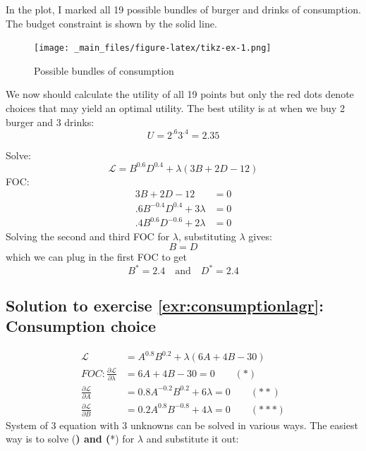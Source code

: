 \documentclass[
  12pt,
  oneside]{book}
\theoremstyle{definition}
\theoremstyle{definition}
\theoremstyle{definition}
\theoremstyle{definition}
\theoremstyle{remark}
\begin{document}
In the plot, I marked all 19 possible bundles of burger and drinks of consumption. The budget constraint is shown by the solid line.

\begin{figure}
\centering
\texttt{[image: \_main\_files/figure-latex/tikz-ex-1.png]}
\caption{\label{fig:tikz-ex}Possible bundles of consumption}
\end{figure}

We now should calculate the utility of all 19 points but only the red dots denote choices that may yield an optimal utility. The best utility is at when we buy 2 burger and 3 drinks: \[U=2^{.6}3^{.4}=2.35\]

Solve:
\[
        \mathcal{L}=B^{0.6}D^{0.4}+\lambda(3B+2D-12)
        \]
FOC:
\begin{align*}
            3B+2D-12&=0\\
            .6B^{-0.4}D^{0.4}+3\lambda&=0\\
            .4B^{0.6}D^{-0.6}+2\lambda&=0
        \end{align*}
Solving the second and third FOC for \(\lambda\), substituting \(\lambda\) gives:
\[B=D\]
which we can plug in the first FOC to get
\[B^*=2.4 \quad \text{and} \quad D^*=2.4\]

\hypertarget{sol:consumptionlagr}{%
\subsection*{Solution to exercise \ref{exr:consumptionlagr}: Consumption choice}\label{sol:consumptionlagr}}

\begin{align*}
        \mathcal{L}&=A^{0.8}B^{0.2}+\lambda(6A+4B-30)\\
        FOC: \frac{\partial \mathcal{L}}{\partial \lambda}&=6A+4B-30=0 \qquad (*)\\
        \frac{\partial \mathcal{L}}{\partial A}&=0.8A^{-0.2}B^{0.2}+6\lambda=0 \qquad (**)\\
        \frac{\partial \mathcal{L}}{\partial B}&=0.2A^{0.8}B^{-0.8}+4\lambda=0 \qquad (***)
    \end{align*}
System of 3 equation with 3 unknowns can be solved in various ways. The easiest way is to solve (\textbf{) and (}*) for \(\lambda\) and substitute it out:
\end{document}
